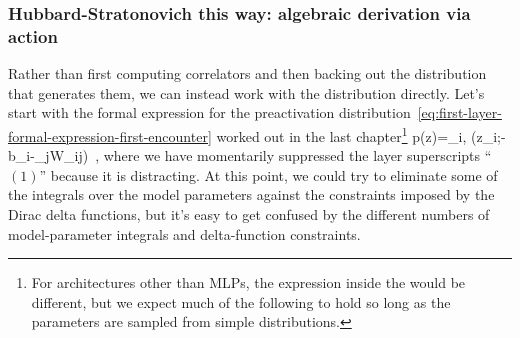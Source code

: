 \subsubsection{Hubbard-Stratonovich this way: algebraic derivation via action}
Rather than first computing correlators and then backing out the distribution that generates them, we can instead work with the distribution directly. Let's start with the formal expression for the preactivation distribution~\eqref{eq:first-layer-formal-expression-first-encounter} worked out in the last chapter\footnote{For architectures other than MLPs, the expression inside the  would be different, but we expect much of the following to hold so long as the parameters are sampled from simple distributions.}
\be\label{eq:first-layer-formal-expression}
p\!\le(z\big\vert\D\ri)=\int \le[  \prod_{i} d b_{i}\ p\!\le(b_{i}\ri) \ri]  \le[\prod_{i,j} d W_{ij}\ p\!\le(W_{ij}\ri) \ri] \prod_{i,\alpha} \delta\!\le(z_{i;\alpha}-b_i-\sum_{j}W_{ij}\ri)\, ,
\ee 
where we have momentarily suppressed the layer superscripts ``${(1)}$'' because it is distracting. At this point, we could try to eliminate some of the integrals over the model parameters against the constraints imposed by the Dirac delta functions, but it's easy to get confused by the different numbers of model-parameter integrals and delta-function constraints.

